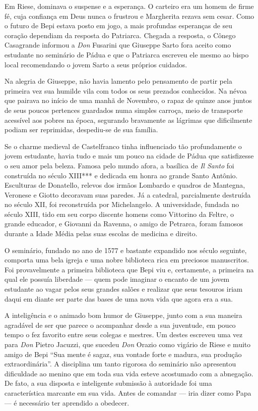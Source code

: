 \documentclass[12pt,a4paper,oneside]{book}
\begin{document}
\quad Em Riese, dominava o suspense e a esperança. O carteiro era um homem de firme fé, cuja confiança em Deus nunca o frustrou e Margherita rezava sem cesar. Como o futuro de Bepi estava posto em jogo, a mais profundas esperanças de seu coração dependiam da resposta do Patriarca. Chegada a resposta, o Cônego Casagrande informou a \emph{Don} Fusarini que Giuseppe Sarto fora aceito como estudante no seminário de Pádua e que o Patriarca escreveu ele mesmo ao bispo local recomendando o jovem Sarto a seus próprios cuidados.

\quad Na alegria de Giuseppe, não havia lamento pelo pensamento de partir pela primeira vez sua humilde vila com todos os seus prezados conhecidos. Na névoa que pairava no início de uma manhã de Novembro, o rapaz de quinze anos juntos de seus poucos pertences guardados numa simples carroça, meio de transporte acessível aos pobres na época, segurando bravamente as lágrimas que dificilmente podiam ser reprimidas, despediu-se de sua família.

\quad Se o charme medieval de Castelfranco tinha influenciado tão profundamente o jovem estudante, havia tudo e mais um pouco na cidade de Pádua que satisfizesse o seu amor pela beleza. Famosa pelo mundo afora, a basílica de \emph{Il Santo} foi construída no século XIII*** e dedicada em honra ao grande Santo Antônio. Esculturas de Donatello, relevos dos irmãos Lombardo e quadros de Mantegna, Veronese e Giotto decoravam suas paredes. Já a catedral, parcialmente destruída no século XII, foi reconstruída por Michelangelo. A universidade, fundada no século XIII, tido em seu corpo discente homens como Vittorino da Feltre, o grande educador, e Giovanni da Ravenna, o amigo de Petrarca, foram famosos durante a Idade Média pelas suas escolas de medicina e direito.

\quad O seminário, fundado no ano de 1577 e bastante expandido nos século seguinte, comporta uma bela igreja e uma nobre biblioteca rica em preciosos manuscritos. Foi provavelmente a primeira biblioteca que Bepi viu e, certamente, a primeira na qual ele possuía liberdade --- quem pode imaginar o encanto de um jovem estudante ao vagar pelos seus grandes salões e realizar que seus tesouros iriam daqui em diante ser parte das bases de uma nova vida que agora era a sua.

\quad A inteligência e o animado bom humor de Giuseppe, junto com a sua maneira agradável de ser que parece o acompanhar desde a sua juventude, em pouco tempo o fez favorito entre seus colegas e mestres. Um destes escreveu uma vez para \emph{Don} Pietro Jacuzzi, que sucedeu \emph{Don} Orazio como vigário de Riese e muito amigo de Bepi ``Sua mente é sagaz, sua vontade forte e madura, sua produção extraordinária''. A disciplina um tanto rigorosa do seminário não apresentou dificuldade ao menino que em toda sua vida esteve acostumado com a abnegação. De fato, a sua disposta e inteligente submissão à autoridade foi uma característica marcante em sua vida. Antes de comandar --- iria dizer como Papa --- é necessário ter aprendido a obedecer.
\end{document}

